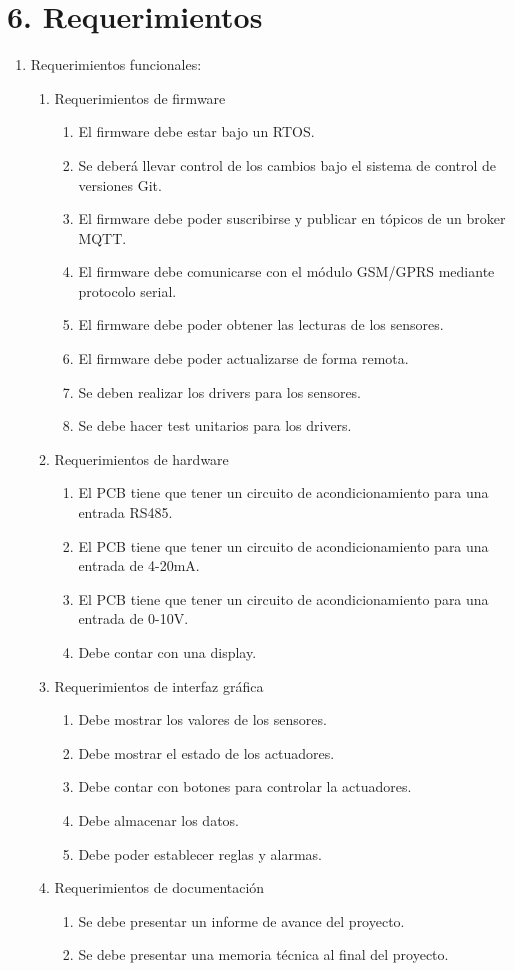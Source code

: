 \documentclass[
11pt, %
codirector, %
]{charter}
\begin{document}
\section{6. Requerimientos}
\label{sec:requerimientos}
\begin{enumerate}
	\item Requerimientos funcionales:
		\begin{enumerate}
			\item Requerimientos de firmware
			\begin{enumerate} 
				\item El firmware debe estar bajo un RTOS.
				\item Se deberá llevar control de los cambios bajo el sistema de control de versiones Git.
				\item El firmware debe poder suscribirse y publicar en tópicos de un broker MQTT.
				\item El firmware debe comunicarse con el módulo GSM/GPRS mediante protocolo serial.
				\item El firmware debe poder obtener las lecturas de los sensores.
				\item El firmware debe poder actualizarse de forma remota.
				\item Se deben realizar los drivers para los sensores.
				\item Se debe hacer test unitarios para los drivers.
			\end{enumerate}
			\item Requerimientos de hardware
			\begin{enumerate} 
				\item El PCB tiene que tener un circuito de acondicionamiento para una entrada RS485.
				\item El PCB tiene que tener un circuito de acondicionamiento para una entrada de 4-20mA.
				\item El PCB tiene que tener un circuito de acondicionamiento para una entrada de 0-10V.
				\item Debe contar con una display.
			\end{enumerate}			
			\item Requerimientos de interfaz gráfica
			\begin{enumerate} 
				\item Debe mostrar los valores de los sensores.
				\item Debe mostrar el estado de los actuadores.
				\item Debe contar con botones para controlar la actuadores.
				\item Debe almacenar los datos.
				\item Debe poder establecer reglas y alarmas. 
			\end{enumerate}
			\item Requerimientos de documentación
			\begin{enumerate} 
				\item Se debe presentar un informe de avance del proyecto.
				\item Se debe presentar una memoria técnica al final del proyecto.
			\end{enumerate}
		\end{enumerate}


\end{enumerate}
\end{document}
